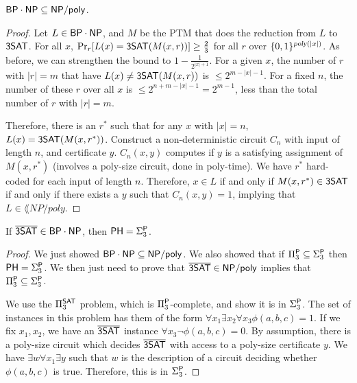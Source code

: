 \begin{theorem}
$\BP\cdot\NP \subseteq \lang{NP/poly}$.
\end{theorem}
\begin{proof}
Let $L \in \BP\cdot\NP$, and $M$ be the PTM that does the reduction from $L$ to $\ThreeSAT$. For all $x$, $\Pr_r[L(x) = \ThreeSAT(M(x,r))] \ge \frac{2}{3}$ for all $r$ over $\{0, 1\}^{\poly(|x|)}$. As before, we can strengthen the bound to $1-\frac{1}{2^{|x|+1}}$. For a given $x$, the number of $r$ with $|r| = m$ that have $L(x) \ne \ThreeSAT(M(x,r))$ is $\le 2^{m-|x|-1}$. For a fixed $n$, the number of these $r$ over all $x$ is $\le 2^{n+m-|x|-1} = 2^{m-1}$, less than the total number of $r$ with $|r| = m$.

\par Therefore, there is an $r^*$ such that for any $x$ with $|x| = n$, $L(x) = \ThreeSAT(M(x,r^*))$. Construct a non-deterministic circuit $C_n$ with input of length $n$, and certificate $y$. $C_n(x, y)$ computes if $y$ is a satisfying assignment of $M(x, r^*)$ (involves a poly-size circuit, done in poly-time). We have $r^*$ hard-coded for each input of length $n$. Therefore, $x \in L$ if and only if $M(x, r^*) \in \ThreeSAT$ if and only if there exists a $y$ such that $C_n(x, y) = 1$, implying that $L \in \lang{NP/poly}$. 
\end{proof}
\begin{theorem}
If $\overline{\ThreeSAT} \in \BP\cdot \NP$, then $\PH = \Sigma_3^\P$. 
\end{theorem}  
\begin{proof}
We just showed $\BP\cdot\NP \subseteq \lang{NP/poly}$. We also showed that if $\Pi_3^\P \subseteq \Sigma_3^\P$ then $\PH = \Sigma_3^\P$. We then just need to prove that $\overline{\ThreeSAT} \in \lang{NP/poly}$ implies that $\Pi_3^\P \subseteq \Sigma_3^\P$. 

\par We use the $\Pi_3^\SAT$ problem, which is $\Pi_3^\P$-complete, and show it is in $\Sigma_3^\P$. The set of instances in this problem has them of the form $\forall x_1 \exists x_2 \forall x_3 \phi(a, b, c) = 1$. If we fix $x_1, x_2$, we have an $\overline{\ThreeSAT}$ instance $\forall x_3 \neg\phi(a, b, c) = 0$. By assumption, there is a poly-size circuit which decides $\overline{\ThreeSAT}$ with access to a poly-size certificate $y$. We have $\exists w \forall x_1 \exists y$ such that $w$ is the description of a circuit deciding whether $\phi(a, b, c)$ is true. Therefore, this is in $\Sigma_3^\P$.
\end{proof}

